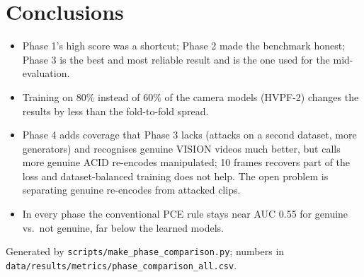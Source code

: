 \documentclass[11pt,a4paper]{article}
\begin{document}
\section{Conclusions}\begin{itemize}
\item Phase 1's high score was a shortcut; Phase 2 made the benchmark honest; Phase 3 is the best and most reliable result and is the one used for the mid-evaluation.
\item Training on 80\% instead of 60\% of the camera models (HVPF-2) changes the results by less than the fold-to-fold spread.
\item Phase 4 adds coverage that Phase 3 lacks (attacks on a second dataset, more generators) and recognises genuine VISION videos much better, but calls more genuine ACID re-encodes manipulated; 10 frames recovers part of the loss and dataset-balanced training does not help. The open problem is separating genuine re-encodes from attacked clips.
\item In every phase the conventional PCE rule stays near AUC 0.55 for genuine vs.\ not genuine, far below the learned models.
\end{itemize}
\noindent\raggedright\small Generated by \texttt{scripts/make\_phase\_comparison.py}; numbers in \texttt{data/results/metrics/phase\_comparison\_all.csv}.
\end{document}
